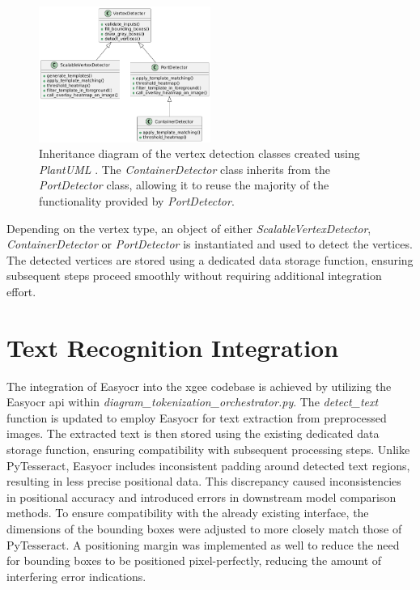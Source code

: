 \begin{figure}
    \centering
    \includegraphics[width=0.5\textwidth]{pictures/inheritance_diagram.png}
    \caption[Inheritance diagram]{Inheritance diagram of the vertex detection classes created using \textit{PlantUML} \autocite{plantuml_2024}. The \textit{ContainerDetector} class inherits from the \textit{PortDetector} class, allowing it to reuse the majority of the functionality provided by \textit{PortDetector}.}
    \label{fig:inheritance_diagram}
\end{figure}
Depending on the vertex type, an object of either \textit{ScalableVertexDetector}, \textit{ContainerDetector} or \textit{PortDetector} is instantiated and used to detect the vertices.\\
The detected vertices are stored using a dedicated data storage function, ensuring subsequent steps proceed smoothly without requiring additional integration effort.

\section{Text Recognition Integration}
The integration of Easy\acrshort{ocr} into the \acrshort{xgee} codebase is achieved by utilizing the Easy\acrshort{ocr} \acrshort{api} within \textit{diagram\_tokenization\_orchestrator.py}. The \textit{detect\_text} function is updated to employ Easy\acrshort{ocr} for text extraction from preprocessed images. The extracted text is then stored using the existing dedicated data storage function, ensuring compatibility with subsequent processing steps.
Unlike PyTesseract, Easy\acrshort{ocr} includes inconsistent padding around detected text regions, resulting in less precise positional data. This discrepancy caused inconsistencies in positional accuracy and introduced errors in downstream model comparison methods. To ensure compatibility with the already existing interface, the dimensions of the bounding boxes were adjusted to more closely match those of PyTesseract. A positioning margin was implemented as well to reduce the need for bounding boxes to be positioned pixel-perfectly, reducing the amount of interfering error indications.

